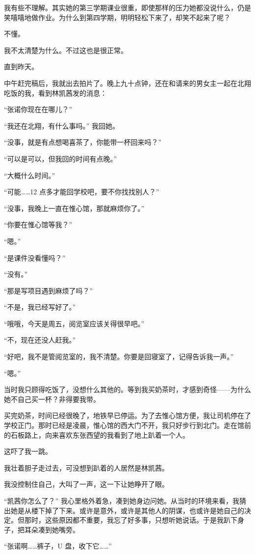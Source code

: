 \documentclass[UTF8]{ctexart}
\begin{document}
我有些不理解。其实她的第三学期课业很重，即使那样的压力她都没说什么，仍是笑嘻嘻地做作业。为什么到第四学期，明明轻松下来了，却笑不起来了呢？

不懂。

我不太清楚为什么。不过这也是很正常。

直到昨天。

中午赶完稿后，我就出去拍片了。晚上九十点钟，还在和请来的男女主一起在北翔吃饭的我，看到林凯茜发的消息：

“张诺你现在在哪儿？”

“我还在北翔，有什么事吗。” 我回她。

“没事，就是有点想喝喜茶了，你能带一杯回来吗？”

“可以是可以，但我回的时间有点晚。”

“大概什么时间。”

“可能……12 点多才能回学校吧，要不你找找别人？”

“没事，我晚上一直在惟心馆，那就麻烦你了。”

“你要在惟心馆等我？”

“嗯。”

“是课件没看懂吗？”

“没有。”

“那是写项目遇到麻烦了吗？”

“不是，我已经写好了。”

“哦哦，今天是周五，阅览室应该关得很早吧。”

“不，现在还没人赶我。”

“好吧，我不是管阅览室的，我不清楚。你要是回寝室了，记得告诉我一声。”

“嗯。”

当时我只顾得吃饭了，没想什么其他的。等到我买奶茶时，才感到奇怪——为什么她不自己买一杯？非得要我带。

买完奶茶，时间已经很晚了，地铁早已停运。为了去惟心馆方便，我让司机停在了学校正门。那时已经是凌晨，惟心馆的西大门不开，我只好步行到北门。走在馆前的石板路上，向来喜欢东张西望的我看到了地上趴着一个人。

这吓了我一跳。

我壮着胆子走过去，可没想到趴着的人居然是林凯茜。

我没控制住自己，大叫了一声，这一下让她睁开了眼。

“凯茜你怎么了？” 我心里格外着急，凑到她身边问她。从当时的环境来看，我猜出她是从楼下掉了下来。或许是意外，或许是其他人的阴谋，也或许是她自己的决定。但那时，这些原因都不重要，我忘了好多事，只想听她说话。于是我趴下身子，把耳朵凑到她嘴旁。

“张诺啊……裤子，U 盘，收下它……”
\end{document}

